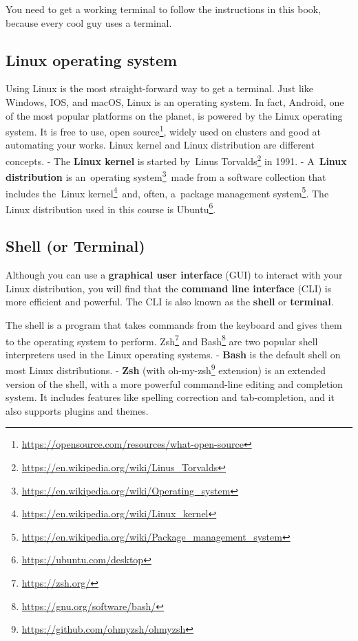 \documentclass[
  notoc %
]{tufte-book}
\DeclareRobustCommand{\href}[2]{#2\footnote{\url{#1}}}
\begin{document}
You need to get a working terminal to follow the instructions in this
book, because every cool guy uses a terminal.

\hypertarget{sec:linux}{%
\subsection{Linux operating system}\label{sec:linux}}

Using Linux is the most straight-forward way to get a terminal. Just
like Windows, IOS, and macOS, Linux is an operating system. In fact,
Android, one of the most popular platforms on the planet, is powered by
the Linux operating system. It is free to use,
\href{https://opensource.com/resources/what-open-source}{open source},
widely used on clusters and good at automating your works. Linux kernel
and Linux distribution are different concepts. - The \textbf{Linux
kernel} is started
by~\href{https://en.wikipedia.org/wiki/Linus_Torvalds}{Linus Torvalds}
in 1991. - A~\textbf{Linux distribution} is
an~\href{https://en.wikipedia.org/wiki/Operating_system}{operating
system}~made from a software collection that includes
the~\href{https://en.wikipedia.org/wiki/Linux_kernel}{Linux kernel}~and,
often,
a~\href{https://en.wikipedia.org/wiki/Package_management_system}{package
management system}. The Linux distribution used in this course is
\href{https://ubuntu.com/desktop}{Ubuntu}.

\hypertarget{sec:shell}{%
\subsection{Shell (or Terminal)}\label{sec:shell}}

Although you can use a \textbf{graphical user interface} (GUI) to
interact with your Linux distribution, you will find that the
\textbf{command line interface} (CLI) is more efficient and powerful.
The CLI is also known as the \textbf{shell} or \textbf{terminal}.

The shell is a program that takes commands from the keyboard and gives
them to the operating system to perform. \href{https://zsh.org/}{Zsh}
and \href{https://gnu.org/software/bash/}{Bash} are two popular shell
interpreters used in the Linux operating systems. - \textbf{Bash} is the
default shell on most Linux distributions. - \textbf{Zsh} (with
\href{https://github.com/ohmyzsh/ohmyzsh}{oh-my-zsh} extension) is an
extended version of the shell, with a more powerful command-line editing
and completion system. It includes features like spelling correction and
tab-completion, and it also supports plugins and themes.
\end{document}
